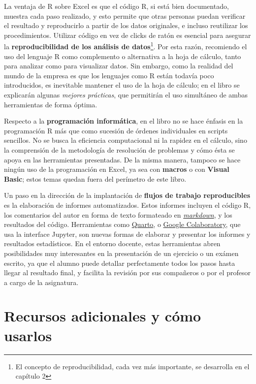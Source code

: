 \documentclass[
  letterpaper,
  DIV=11,
  numbers=noendperiod,
  oneside]{scrreprt}
\begin{document}
La ventaja de R sobre Excel es que el código R, si está bien
documentado, muestra cada paso realizado, y esto permite que otras
personas puedan verificar el resultado y reproducirlo a partir de los
datos originales, e incluso reutilizar los procedimientos. Utilizar
código en vez de clicks de ratón es esencial para asegurar la
\textbf{reproducibilidad de los análisis de datos}\footnote{El concepto
  de reproducibilidad, cada vez más importante, se desarrolla en el
  capítulo 2}. Por esta razón, recomiendo el uso del lenguaje R como
complemento o alternativa a la hoja de cálculo, tanto para analizar como
para visualizar datos. Sin embargo, como la realidad del mundo de la
empresa es que los lenguajes como R están todavía poco introducidos, es
inevitable mantener el uso de la hoja de cálculo; en el libro se
explicarán algunas \emph{mejores prácticas}, que permitirán el uso
simultáneo de ambas herramientas de forma óptima.

Respecto a la \textbf{programación informática}, en el libro no se hace
énfasis en la programación R más que como sucesión de órdenes
individuales en scripts sencillos. No se busca la eficiencia
computacional ni la rapidez en el cálculo, sino la comprensión de la
metodología de resolución de problemas y cómo ésta se apoya en las
herramientas presentadas. De la misma manera, tampoco se hace ningún uso
de la programación en Excel, ya sea con \textbf{macros} o con
\textbf{Visual Basic}; estos temas quedan fuera del perímetro de este
libro.

Un paso en la dirección de la implantación de \textbf{flujos de trabajo
reproducibles} es la elaboración de informes automatizados. Estos
informes incluyen el código R, los comentarios del autor en forma de
texto formateado en
\href{https://es.wikipedia.org/wiki/Markdown}{\emph{markdown}}, y los
resultados del código. Herramientas como
\href{https://quarto.org/}{Quarto}, o
\href{https://colab.research.google.com/}{Google Colaboratory}, que usa
la interface Jupyter, son nuevas formas de elaborar y presentar los
informes y resultados estadísticos. En el entorno docente, estas
herramientas abren posibilidades muy interesantes en la presentación de
un ejercicio o un exámen escrito, ya que el alumno puede detallar
perfectamente todos los pasos hasta llegar al resultado final, y
facilita la revisión por sus compañeros o por el profesor a cargo de la
asignatura.

\hypertarget{recursos-adicionales-y-cuxf3mo-usarlos}{%
\section*{Recursos adicionales y cómo
usarlos}\label{recursos-adicionales-y-cuxf3mo-usarlos}}
\end{document}
